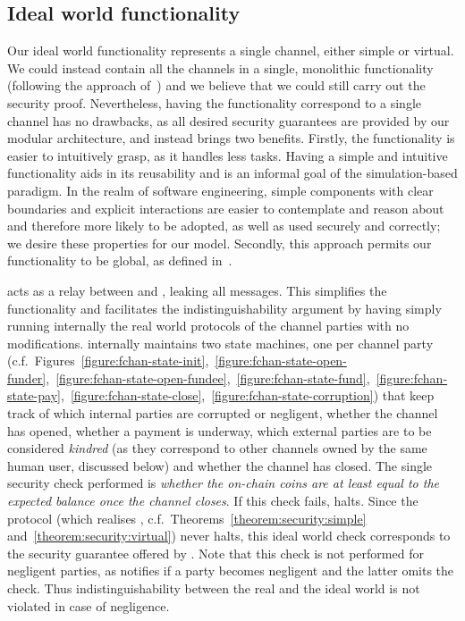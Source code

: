   \subsection{Ideal world functionality \fchan}
  Our ideal world functionality \fchan represents a single channel, either
  simple or virtual. We could instead contain all the channels in a single,
  monolithic functionality (following the approach
  of~\cite{DBLP:conf/csfw/KiayiasL20}) and we believe that we could still carry
  out the security proof. Nevertheless, having the functionality correspond to a
  single channel has no drawbacks, as all desired security guarantees are
  provided by our modular architecture, and instead brings two benefits.
  Firstly, the functionality is easier to intuitively grasp, as it handles less
  tasks. Having a simple and intuitive functionality aids in its reusability and
  is an informal goal of the simulation-based paradigm. In the realm of software
  engineering, simple components with clear boundaries and explicit interactions
  are easier to contemplate and reason about and therefore more likely to be
  adopted, as well as used securely and correctly; we desire these properties
  for our model. Secondly, this approach permits our functionality to be global,
  as defined in~\cite{DBLP:conf/tcc/BadertscherCHTZ20}.

  \fchan acts as a relay between \adversary and \environment, leaking all
  messages. This simplifies the functionality and facilitates the
  indistinguishability argument by having \simulator simply running internally
  the real world protocols of the channel parties \pchan with no modifications.
  \fchan internally maintains two state machines, one per channel party (c.f.\
  Figures~\ref{figure:fchan-state-init},~\ref{figure:fchan-state-open-funder},~\ref{figure:fchan-state-open-fundee},~\ref{figure:fchan-state-fund},~\ref{figure:fchan-state-pay},~\ref{figure:fchan-state-close},~\ref{figure:fchan-state-corruption})
  that keep track of which internal parties are corrupted or negligent, whether
  the channel has opened, whether a payment is underway, which external parties
  are to be considered \emph{kindred} (as they correspond to other channels
  owned by the same human user, discussed below) and whether the channel has
  closed. The single security check performed is \emph{whether the on-chain
  coins are at least equal to the expected balance once the channel closes}. If
  this check fails, \fchan halts. Since the protocol \pchan (which realises
  \fchan, c.f.\ Theorems~\ref{theorem:security:simple}
  and~\ref{theorem:security:virtual}) never halts, this ideal world check
  corresponds to the security guarantee offered by \pchan. Note that this check
  is not performed for negligent parties, as \simulator notifies \fchan if a
  party becomes negligent and the latter omits the check. Thus
  indistinguishability between the real and the ideal world is not violated in
  case of negligence.

